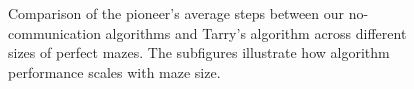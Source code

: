 \begin{figure}[H]
    \centering
    \qquad
    \qquad
    \newline
    \qquad
    \newline
    \qquad
    \caption{Comparison of the pioneer's average steps between our no-communication algorithms and Tarry's algorithm across different sizes of perfect mazes. The subfigures illustrate how algorithm performance scales with maze size.}
    \label{fig_no_comm_steps_all_sizes_maze}
\end{figure}

